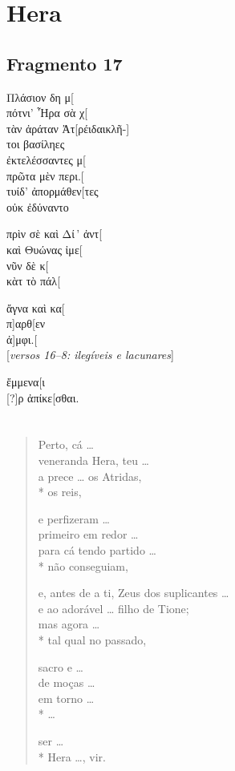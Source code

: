 \chapter{Hera}

\section{Fragmento 17}

\begin{gkverse}
Πλάσιον δη μ[\\
πότνι’ Ἦρα σὰ χ[\\
τὰν ἀράταν Ἀτ[ρέιδαι\qquad        κλῆ-]\\
τοι βασίληες\\

ἐκτελέσσαντες μ[\\
πρῶτα μὲν περι.[\\
τυίδ’ ἀπορμάθεν[τες\\
οὐκ ἐδύναντο

πρὶν σὲ καὶ Δί\,’ ἀντ[\\
καὶ Θυώνας ἰμε[\\
νῦν δὲ κ[\\
κὰτ τὸ πάλ[

ἄγνα καὶ κα[\\
π]αρθ[εν\\
ἀ]μφι.[\\

\textnormal{[\textit{versos 16--8: ilegíveis e lacunares}]}

ἔμμενα[ι\\
{[}?{]}ρ ἀπίκε[σθαι.
\end{gkverse}

\chapter*{}
\section*{}

\begin{verse}
Perto, cá \ldots{}\\
veneranda Hera, teu \ldots{}\\
a prece \ldots{} os Atridas,\\*
os reis,

e perfizeram \ldots{}\\
primeiro em redor \ldots{}\\
para cá tendo partido \ldots{}\\*
não conseguiam,

e, antes de a ti, Zeus dos suplicantes \ldots{}\\
e ao adorável \ldots{} filho de Tione;\\
mas agora \ldots{}\\*
tal qual no passado,

sacro e \ldots{}\\
de moças \ldots{}\\
em torno \ldots{}\\*
\ldots{}

ser \ldots{}\\*
Hera \ldots{}, vir.
\end{verse}

